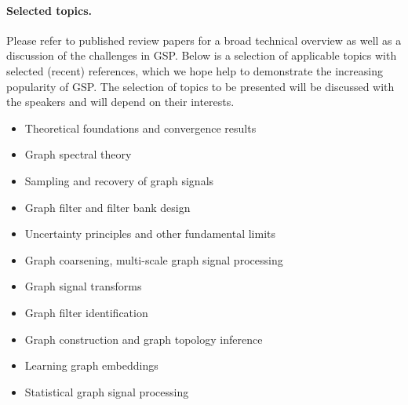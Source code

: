 \documentclass[a4paper]{scrartcl}
\begin{document}
\paragraph{Selected topics.}
Please refer to published review papers \cite{shuman_emerging_2013,
sandryhaila_discrete_2014, coifman_diffusion_2006, ekambaram_circulant_2013} for
a broad technical overview as well as a discussion of the challenges in GSP.
Below is a selection of applicable topics with selected (recent) references,
which we hope help to demonstrate the increasing popularity of GSP. The
selection of topics to be presented will be discussed with the speakers and will
depend on their interests.
\begin{itemize}
	\setlength{\itemsep}{0pt} \setlength{\parskip}{0pt}
	\item Theoretical foundations and convergence results
		\cite{belkin2007convergence, von2008consistency}
	\item Graph spectral theory
		\cite{chung1997spectral, belkin2007convergence, shuman2015vertex,
		sandryhaila2014discrete, Nakatsukasa2013mysteries, brooks, dekel}
	\item Sampling and recovery of graph signals
		\cite{puy2015random, tsitsvero2015signals, anis2014towards}
	\item Graph filter and filter bank design
		\cite{hammond2011wavelets, narang_bior_filters, ekambaram_globalsip,
		leonardi_multislice, leonardi_fmri, shuman2013spectrum}
	\item Uncertainty principles and other fundamental limits
		\cite{perraudin2016global, agaskar_spie, pasdeloup}
	\item Graph coarsening, multi-scale graph signal processing
		\cite{spielman2011graph, shuman2016multiscale, liu_coarsening,
		lafon_coarse, jansen}
	\item Graph signal transforms
		\cite{szlam,gavish, Maggioni_biorthogonal, coifman_diffusion_2006,
		lafon_coarse, narang_lifting_graphs}
	\item Graph filter identification
		\cite{thanou_TSP_2014}
	\item Graph construction and graph topology inference
		\cite{kalofolias2016learn, Dong:2014tj}
	\item Learning graph embeddings
		\cite{von2008consistency, zhou2006learning, belkin2003laplacian}
	\item Statistical graph signal processing
		\cite{perraudin2016stationary, zhang2015graph, gadde2015probabilistic}

\end{itemize}
\end{document}
